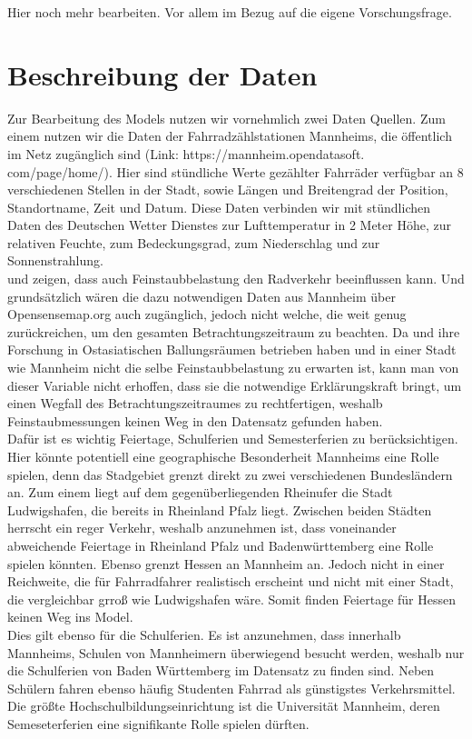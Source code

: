 \documentclass[a4paper,12pt]{thesis}
\begin{document}
Hier noch mehr bearbeiten. Vor allem im Bezug auf die eigene Vorschungsfrage.

\chapter{Beschreibung der Daten}

Zur Bearbeitung des Models nutzen wir vornehmlich zwei Daten Quellen. Zum einem nutzen wir die Daten der Fahrradzählstationen Mannheims, die öffentlich im Netz zugänglich sind (Link: https://mannheim.opendatasoft. com/page/home/). Hier sind stündliche Werte gezählter Fahrräder verfügbar an 8 verschiedenen Stellen in der Stadt, sowie Längen und Breitengrad der Position, Standortname, Zeit und Datum. Diese Daten verbinden wir mit stündlichen Daten des Deutschen Wetter Dienstes zur Lufttemperatur in 2 Meter Höhe, zur relativen Feuchte, zum Bedeckungsgrad, zum Niederschlag und zur Sonnenstrahlung.\\
\cite{ZHAO2018826} und \cite{Hong2022} zeigen, dass auch Feinstaubbelastung den Radverkehr beeinflussen kann. Und grundsätzlich wären die dazu notwendigen Daten aus Mannheim über Opensensemap.org auch zugänglich, jedoch nicht welche, die weit genug zurückreichen, um den gesamten Betrachtungszeitraum zu beachten. Da \cite{ZHAO2018826} und \cite{Hong2022} ihre Forschung in Ostasiatischen Ballungsräumen betrieben haben und in einer Stadt wie Mannheim nicht die selbe Feinstaubbelastung zu erwarten ist, kann man von dieser Variable nicht erhoffen, dass sie die notwendige Erklärungskraft bringt, um einen Wegfall des Betrachtungszeitraumes zu rechtfertigen, weshalb Feinstaubmessungen keinen Weg in den Datensatz gefunden haben.\\
Dafür ist es wichtig Feiertage, Schulferien und Semesterferien zu berücksichtigen. Hier könnte potentiell eine geographische Besonderheit Mannheims eine Rolle spielen, denn das Stadgebiet grenzt direkt zu zwei verschiedenen Bundesländern an. Zum einem liegt auf dem gegenüberliegenden Rheinufer die Stadt Ludwigshafen, die bereits in Rheinland Pfalz liegt. Zwischen beiden Städten herrscht ein reger Verkehr, weshalb anzunehmen ist, dass voneinander abweichende Feiertage in Rheinland Pfalz und Badenwürttemberg eine Rolle spielen könnten. Ebenso grenzt Hessen an Mannheim an. Jedoch nicht in einer Reichweite, die für Fahrradfahrer realistisch erscheint und nicht mit einer Stadt, die vergleichbar grroß wie Ludwigshafen wäre. Somit finden Feiertage für Hessen keinen Weg ins Model.\\
Dies gilt ebenso für die Schulferien. Es ist anzunehmen, dass innerhalb Mannheims, Schulen von Mannheimern überwiegend besucht werden, weshalb nur die Schulferien von Baden Württemberg im Datensatz zu finden sind. Neben Schülern fahren ebenso häufig Studenten Fahrrad als günstigstes Verkehrsmittel. Die größte Hochschulbildungseinrichtung ist die Universität Mannheim, deren Semeseterferien eine signifikante Rolle spielen dürften.
\end{document}

